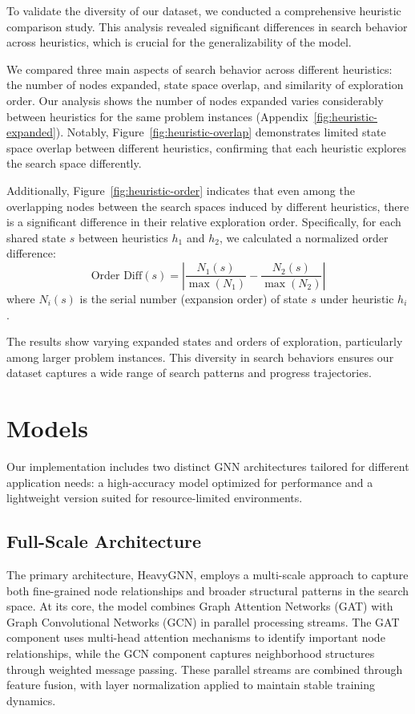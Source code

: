 \documentclass[letterpaper]{article}
\begin{document}
To validate the diversity of our dataset, we conducted a comprehensive heuristic comparison study. This analysis revealed significant differences in search behavior across heuristics, which is crucial for the generalizability of the model. 

We compared three main aspects of search behavior across different heuristics: the number of nodes expanded, state space overlap, and similarity of exploration order.
Our analysis shows the number of nodes expanded varies considerably between heuristics for the same problem instances (Appendix~\ref{fig:heuristic-expanded}). Notably, Figure~\ref{fig:heuristic-overlap} demonstrates limited state space overlap between different heuristics, confirming that each heuristic explores the search space differently. 

Additionally, Figure~\ref{fig:heuristic-order} indicates that even among the overlapping nodes between the search spaces induced by different heuristics, there is a significant difference in their relative exploration order. Specifically, for each shared state $s$ between heuristics $h_1$ and $h_2$, we calculated a normalized order difference:
\begin{equation}\label{eq:order-diff}
    \text{Order Diff}(s) = \left|\frac{N_1(s)}{\max(N_1)} - \frac{N_2(s)}{\max(N_2)}\right|
\end{equation}
where $N_i(s)$ is the serial number (expansion order) of state $s$ under heuristic $h_i$. 

The results show varying expanded states and orders of exploration, particularly among larger problem instances. This diversity in search behaviors ensures our dataset captures a wide range of search patterns and progress trajectories.

\section{Models} \label{sec:models}

Our implementation includes two distinct GNN architectures tailored for different application needs: a high-accuracy model optimized for performance and a lightweight version suited for resource-limited environments.

\subsection{Full-Scale Architecture}
The primary architecture, HeavyGNN, employs a multi-scale approach to capture both fine-grained node relationships and broader structural patterns in the search space. At its core, the model combines Graph Attention Networks (GAT) with Graph Convolutional Networks (GCN) in parallel processing streams. The GAT component uses multi-head attention mechanisms to identify important node relationships, while the GCN component captures neighborhood structures through weighted message passing. These parallel streams are combined through feature fusion, with layer normalization applied to maintain stable training dynamics.
\end{document}
